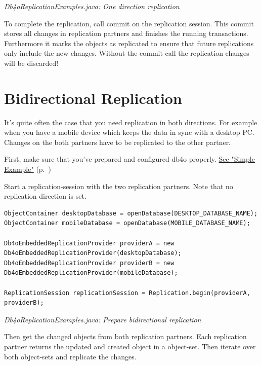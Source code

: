 {\small\itshape Db4oReplicationExamples.java: One direction replication\par}
\medskip

To complete the replication, call commit on the replication session. This commit stores all changes in replication partners and finishes the running transactions. Furthermore it marks the objects as replicated to ensure that future replications only include the new changes. Without the commit call the replication-changes will be discarded!

\section{Bidirectional Replication}
\label{drs:db4o-replication-system-drs-db4o-databases-replication-bi-directional-replication}

It's quite often the case that you need replication in both directions. For example when you have a mobile device which keeps the data in sync with a desktop PC. Changes on the both partners have to be replicated to the other partner.

First, make sure that you've prepared and configured db4o properly. \hyperref[drs:db4o-replication-system-drs-db4o-databases-replication-simple-example]{See "Simple Example"} (p.~\pageref{drs:db4o-replication-system-drs-db4o-databases-replication-simple-example})

Start a replication-session with the two replication partners. Note that no replication direction is set.

\begin{lstlisting}
ObjectContainer desktopDatabase = openDatabase(DESKTOP_DATABASE_NAME);
ObjectContainer mobileDatabase = openDatabase(MOBILE_DATABASE_NAME);

Db4oEmbeddedReplicationProvider providerA = new Db4oEmbeddedReplicationProvider(desktopDatabase);
Db4oEmbeddedReplicationProvider providerB = new Db4oEmbeddedReplicationProvider(mobileDatabase);

ReplicationSession replicationSession = Replication.begin(providerA, providerB);
\end{lstlisting}

{\small\itshape Db4oReplicationExamples.java: Prepare bidirectional replication\par}
\medskip

Then get the changed objects from both replication partners. Each replication partner returns the updated and created object in a object-set. Then iterate over both object-sets and replicate the changes.

